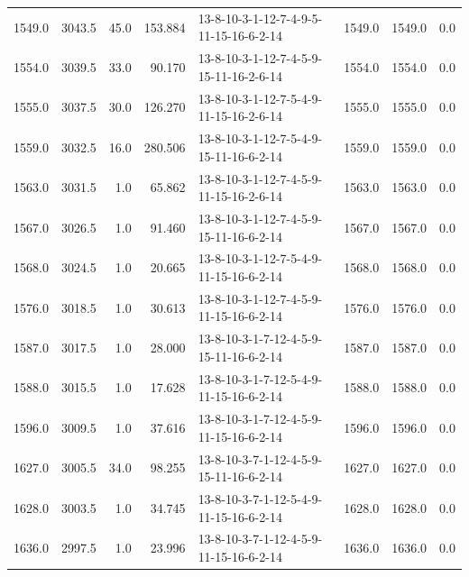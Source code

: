 \begin{tabular}{rrrrlrrr}
 1549.0 &  3043.5 &           45.0 &            153.884 &  13-8-10-3-1-12-7-4-9-5-11-15-16-6-2-14 &        1549.0 &          1549.0 &       0.0 \\
 1554.0 &  3039.5 &           33.0 &             90.170 &  13-8-10-3-1-12-7-4-5-9-15-11-16-2-6-14 &        1554.0 &          1554.0 &       0.0 \\
 1555.0 &  3037.5 &           30.0 &            126.270 &  13-8-10-3-1-12-7-5-4-9-11-15-16-2-6-14 &        1555.0 &          1555.0 &       0.0 \\
 1559.0 &  3032.5 &           16.0 &            280.506 &  13-8-10-3-1-12-7-5-4-9-15-11-16-6-2-14 &        1559.0 &          1559.0 &       0.0 \\
 1563.0 &  3031.5 &            1.0 &             65.862 &  13-8-10-3-1-12-7-4-5-9-11-15-16-2-6-14 &        1563.0 &          1563.0 &       0.0 \\
 1567.0 &  3026.5 &            1.0 &             91.460 &  13-8-10-3-1-12-7-4-5-9-15-11-16-6-2-14 &        1567.0 &          1567.0 &       0.0 \\
 1568.0 &  3024.5 &            1.0 &             20.665 &  13-8-10-3-1-12-7-5-4-9-11-15-16-6-2-14 &        1568.0 &          1568.0 &       0.0 \\
 1576.0 &  3018.5 &            1.0 &             30.613 &  13-8-10-3-1-12-7-4-5-9-11-15-16-6-2-14 &        1576.0 &          1576.0 &       0.0 \\
 1587.0 &  3017.5 &            1.0 &             28.000 &  13-8-10-3-1-7-12-4-5-9-15-11-16-6-2-14 &        1587.0 &          1587.0 &       0.0 \\
 1588.0 &  3015.5 &            1.0 &             17.628 &  13-8-10-3-1-7-12-5-4-9-11-15-16-6-2-14 &        1588.0 &          1588.0 &       0.0 \\
 1596.0 &  3009.5 &            1.0 &             37.616 &  13-8-10-3-1-7-12-4-5-9-11-15-16-6-2-14 &        1596.0 &          1596.0 &       0.0 \\
 1627.0 &  3005.5 &           34.0 &             98.255 &  13-8-10-3-7-1-12-4-5-9-15-11-16-6-2-14 &        1627.0 &          1627.0 &       0.0 \\
 1628.0 &  3003.5 &            1.0 &             34.745 &  13-8-10-3-7-1-12-5-4-9-11-15-16-6-2-14 &        1628.0 &          1628.0 &       0.0 \\
 1636.0 &  2997.5 &            1.0 &             23.996 &  13-8-10-3-7-1-12-4-5-9-11-15-16-6-2-14 &        1636.0 &          1636.0 &       0.0 \\

\end{tabular}
